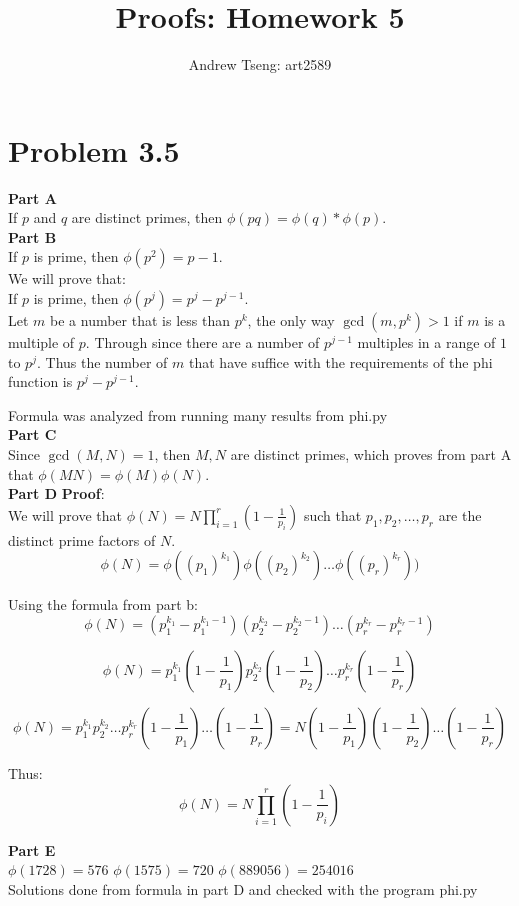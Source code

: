 \documentclass[10pt]{amsart}
\title{Proofs: Homework 5}
\author{Andrew Tseng: art2589}
\begin{document}
\maketitle
\thispagestyle{empty}

\section*{\large \textbf{Problem 3.5}}
\begin{addmargin}{8pt}

\textbf{\small Part A} \\
If $p$ and $q$ are distinct primes, then $\phi(pq) = \phi(q) * \phi(p)$. \\

\noindent \textbf{\small Part B} \\
If $p$ is prime, then $\phi(p^2) = p - 1$. \\
We will prove that: \\
If $p$ is prime, then $\phi(p^j) = p^{j} - p^{j-1}$. \\
Let $m$ be a number that is less than $p^k$, the only way $\gcd(m,p^k) > 1$ if
$m$ is a multiple of $p$. Through since there are a number of $p^{j-1}$ multiples
in a range of $1$ to $p^j$. Thus the number of $m$ that have suffice with the
requirements of the phi function is $p^j - p^{j-1}$.

Formula was analyzed from running many results from phi.py \\

\noindent \textbf{\small Part C} \\
Since $\gcd(M,N) = 1$, then $M,N$ are distinct primes, which proves
from part A that $\phi(MN) = \phi(M)\phi(N)$. \\

\noindent \textbf{\small Part D}
\textbf{\small Proof}: \\
\indent We will prove that $\phi(N) = N\prod_{i=1}^{r}(1 - \frac{1}{p_{i}})$ such that
$p_{1}, p_{2}, \ldots ,p_{r}$ are the distinct prime factors of $N$.
\[\phi(N) = \phi((p_{1})^{k_{1}})\phi((p_{2})^{k_{2}}) \ldots \phi((p_{r})^{k_{r}}))\]

Using the formula from part b:
\[\phi(N) = (p_{1}^{k_{1}} - p_{1}^{k_{1} - 1})(p_{2}^{k_{2}} - p_{2}^{k_{2} - 1})
\ldots (p_{r}^{k_{r}} - p_{r}^{k_{r} - 1})\]

\[\phi(N) = p_{1}^{k_{1}}(1 - \frac{1}{p_{1}}) p_{2}^{k_{2}}(1 - \frac{1}{p_{2}})
\ldots  p_{r}^{k_{r}}(1 - \frac{1}{p_{r}})
\]

\[\phi(N) = p_{1}^{k_{1}}p_{2}^{k_{2}} \ldots p_{r}^{k_{r}}(1 - \frac{1}{p_{1}})
\ldots (1 - \frac{1}{p_{r}}) = N(1 - \frac{1}{p_{1}})(1 - \frac{1}{p_{2}})
\ldots (1 - \frac{1}{p_{r}})\]

Thus:
\[\phi(N) = N\prod_{i=1}^{r}(1 - \frac{1}{p_{i}})\]


\noindent \textbf{\small Part E} \\
$\phi(1728) = 576$
$\phi(1575) = 720$
$\phi(889056) = 254016$ \\
Solutions done from formula in part D and checked with the program phi.py
\end{addmargin}
\end{document}
